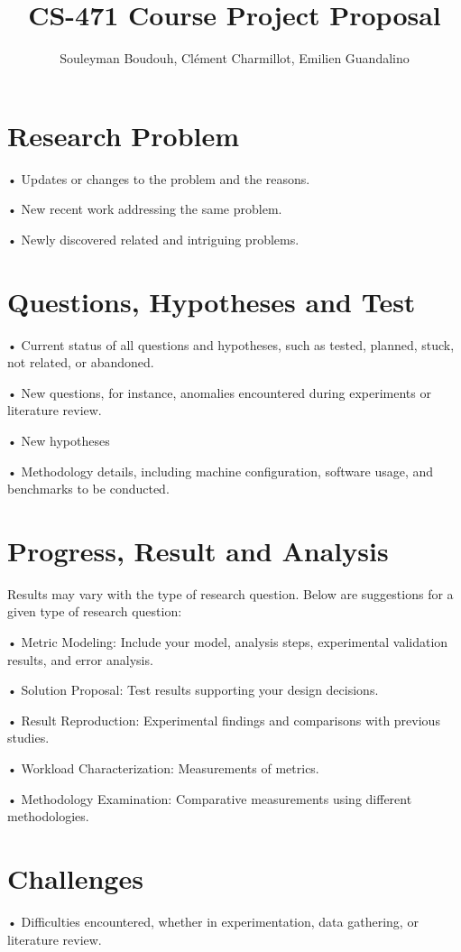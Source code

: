 \documentclass[12pt]{article}
\author{
  Souleyman Boudouh, Clément Charmillot, Emilien Guandalino\\
}
\begin{document}
\title{CS-471 Course Project Proposal}
\date{}
\maketitle

\vspace{-3em}



\section{Research Problem}
• Updates or changes to the problem and the reasons.

• New recent work addressing the same problem.

• Newly discovered related and intriguing problems.

\section{Questions, Hypotheses and Test}

• Current status of all questions and hypotheses, such as tested, planned, stuck, not related, or abandoned.

• New questions, for instance, anomalies encountered during experiments or literature review.

• New hypotheses

• Methodology details, including machine configuration, software usage, and benchmarks to be conducted.

\section{Progress, Result and Analysis}

Results may vary with the type of research question. Below are suggestions for a given type of research question:

• Metric Modeling: Include your model, analysis steps, experimental validation results, and error analysis.

• Solution Proposal: Test results supporting your design decisions.

• Result Reproduction: Experimental findings and comparisons with previous studies.

• Workload Characterization: Measurements of metrics.

• Methodology Examination: Comparative measurements using different methodologies.

\section{Challenges}
• Difficulties encountered, whether in experimentation, data gathering, or literature review.
\end{document}
